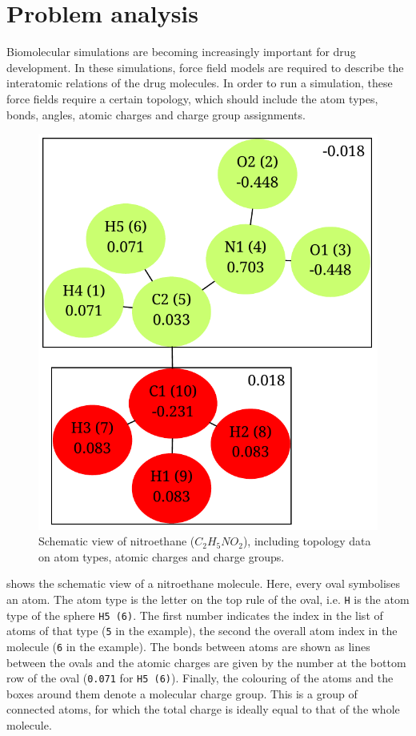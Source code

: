 \chapter{Problem analysis}

Biomolecular simulations are becoming increasingly important for drug development. In these simulations, force field models are required to describe the interatomic relations of the drug molecules. In order to run a simulation, these force fields require a certain topology, which should include the atom types, bonds, angles, atomic charges and charge group assignments.


\begin{figure}[h!]
\begin{center}
\includegraphics[width=.4\textwidth]{img/partial_charges.pdf}
\caption{Schematic view of nitroethane ($C_{2}H_{5}NO_{2}$), including topology data on atom types, atomic charges and charge groups.}
\end{center}
\end{figure}

 shows the schematic view of a nitroethane molecule. Here, every oval symbolises an atom. The atom type is the letter on the top rule of the oval, i.e. \verb|H| is the atom type of the sphere \verb|H5 (6)|. The first number indicates the index in the list of atoms of that type (\verb|5| in the example), the second the overall atom index in the molecule (\verb|6| in the example). The bonds between atoms are shown as lines between the ovals and the atomic charges are given by the number at the bottom row of the oval (\verb|0.071| for \verb|H5 (6)|). Finally, the colouring of the atoms and the boxes around them denote a molecular charge group. This is a group of connected atoms, for which the total charge is ideally equal to that of the whole molecule.


